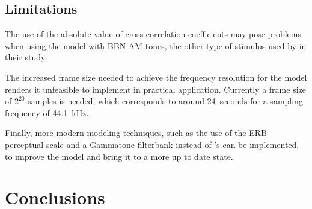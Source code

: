 \documentclass[../main.tex]{subfiles}
\begin{document}
\subsection{Limitations}

The use of the absolute value of cross correlation coefficients may pose
problems when using the model with \gls{BBN} \gls{AM} tones, the other type
of stimulus used by \citeauthor{Fastl2007Psychoacoustics} in their study.

The increased frame size needed to achieve the frequency resolution for the
model renders it unfeasible to implement in practical application. Currently
a frame size of $2^{20}$ samples is needed, which corresponds to around
24~seconds for a sampling frequency of 44.1~kHz.

Finally, more modern modeling techniques, such as the use of the ERB perceptual
scale and a Gammatone filterbank instead of \citeauthor{Terhardt1979}'s can be
implemented, to improve the model and bring it to a more up to date state.

\section{Conclusions}
\end{document}
